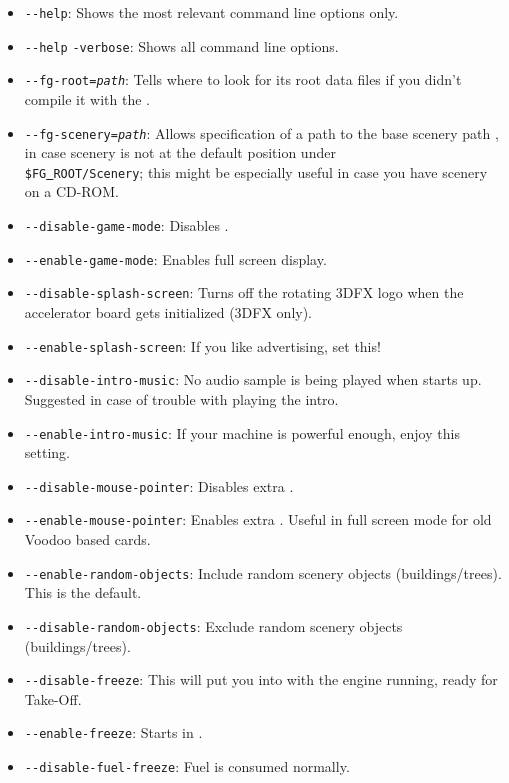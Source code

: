 \begin{itemize}
\item{\texttt{-$ $-help}}: Shows the most relevant command line options only.
\item{\texttt{-$ $-help} \texttt{-verbose}}: Shows all command line options.
\item{\texttt{-$ $-fg-root={\it path}}}: Tells \FlightGear{} where to look for its root data
  files if you didn't compile it with the .
\item{\texttt{-$ $-fg-scenery={\it path}}}: Allows specification of a path to the base scenery path , in case scenery is not at the default position under\\
 \texttt{\$FG\underline{~}ROOT/Scenery}; this might be especially useful in case you
have scenery on a CD-ROM.
\item{\texttt{-$ $-disable-game-mode}}: Disables .
\item{\texttt{-$ $-enable-game-mode}}: Enables full screen display.
\item{\texttt{-$ $-disable-splash-screen}}: Turns off the rotating 3DFX logo
 when the accelerator board gets initialized (3DFX only).
\item{\texttt{-$ $-enable-splash-screen}}: If you like advertising, set this!
\item{\texttt{-$ $-disable-intro-music}}: No audio sample is being played when
  \FlightGear{} starts up. Suggested in case of trouble with playing the intro.
\item{\texttt{-$ $-enable-intro-music}}: If your machine is powerful enough, enjoy
  this setting.
\item{\texttt{-$ $-disable-mouse-pointer}}: Disables extra .
\item{\texttt{-$ $-enable-mouse-pointer}}: Enables extra . Useful in
full screen mode for old Voodoo based cards.
\item{\texttt{-$ $-enable-random-objects}}: Include random scenery objects (buildings/trees). This is the default.
\item{\texttt{-$ $-disable-random-objects}}: Exclude random scenery objects (buildings/trees).
\item{\texttt{-$ $-disable-freeze}}: This will put you into \FlightGear{} with the
  engine running, ready for Take-Off.
\item{\texttt{-$ $-enable-freeze}}: Starts \FlightGear{} in .
\item{\texttt{-$ $-disable-fuel-freeze}}: Fuel is consumed normally.

\end{itemize}
